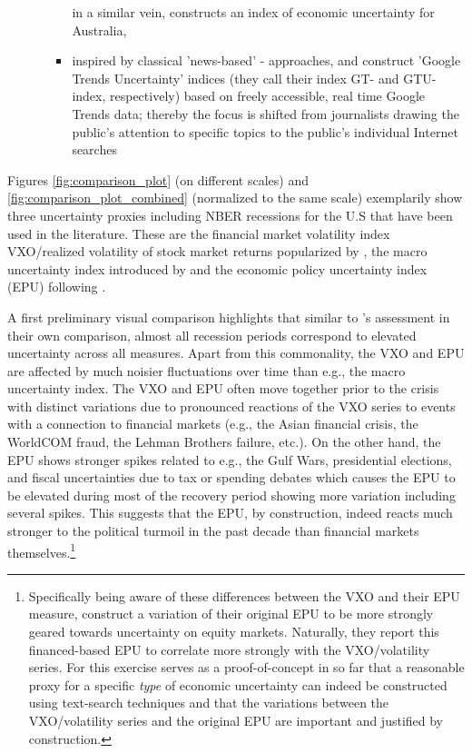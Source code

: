 \documentclass[a4paper,11pt,listof=nochaptergap,oneside,pointednumbers,bibtotoc,bigheadings,liststotoc]{scrbook}
\theoremstyle{mysatz}
\theoremstyle{mydefinition}
\theoremstyle{mytheorem}
\theoremstyle{mybemerkung}
\begin{document}
\begin{itemize}
\begin{itemize}
\begin{itemize}
			in a similar vein, \citet{moore:17} constructs an index of economic uncertainty for Australia,
				\item inspired by classical 'news-based' - approaches, \citet{bontempietal:16} and \citet{castelnuovoandtran:17} construct 'Google Trends Uncertainty' indices (they call their index GT- and GTU-index, respectively) based on freely accessible, real time Google Trends data; thereby the focus is shifted from journalists drawing the public's attention to specific topics to the public's individual Internet searches
			\end{itemize}
		\end{itemize}
\end{itemize} 



Figures \ref{fig:comparison_plot} (on different scales) and \ref{fig:comparison_plot_combined} (normalized to the same scale) exemplarily show three uncertainty proxies including NBER recessions for the U.S that have been used in the literature. These are the financial market volatility index VXO/realized volatility of stock market returns popularized by \citet{bloom:09}, the macro uncertainty index introduced by \citet{juradoetal:15} and the economic policy uncertainty index (EPU) following \citet{bakeretal:15}.

A first preliminary visual comparison highlights that similar to \citet{bachmannetal:13}'s assessment in their own comparison, almost all recession periods correspond to elevated uncertainty across all measures. Apart from this commonality, the VXO and EPU are affected by much noisier fluctuations over time than e.g., the macro uncertainty index. The VXO and EPU often move together prior to the crisis with distinct variations due to pronounced reactions of the VXO series to events with a connection to financial markets (e.g., the Asian financial crisis, the WorldCOM fraud, the Lehman Brothers failure, etc.). On the other hand, the EPU shows stronger spikes related to e.g., the Gulf Wars, presidential elections, and fiscal uncertainties due to tax or spending debates which causes the EPU to be elevated during most of the recovery period showing more variation including several spikes. This suggests that the EPU, by construction, indeed reacts much stronger to the political turmoil in the past decade than financial markets themselves.\footnote{Specifically being aware of these differences between the VXO and their EPU measure, \citet{bakeretal:15} construct a variation of their original EPU to be more strongly geared towards uncertainty on equity markets. Naturally, they report this financed-based EPU to correlate more strongly with the VXO/volatility series. For \citet{bakeretal:15} this exercise serves as a proof-of-concept in so far that a reasonable proxy for a specific \textit{type} of economic uncertainty can indeed be constructed using text-search techniques and that the variations between the VXO/volatility series and the original EPU are important and justified by construction.} 
\end{document}
